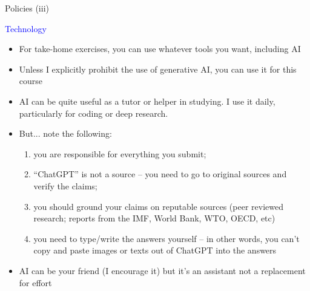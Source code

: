 \documentclass[notes,11pt, aspectratio=169, xcolor=table]{beamer}
\newenvironment{wideitemize}{\itemize\addtolength{\itemsep}{10pt}}{\enditemize}
\begin{document}
\begin{frame}{Policies (iii)}

\begin{wideitemize}
    \item  \textcolor{blue}{Technology}
    \begin{itemize}
        \item For take-home exercises, you can use whatever tools you want, including AI
        \item<2-> Unless I explicitly prohibit the use of generative AI, you can use it for this course
        \item<3-> AI can be quite useful as a tutor or helper in studying. I use it daily, particularly for coding or deep research.
        \item<4-> But... note the following:
        \begin{enumerate}
            \item you are responsible for everything you submit;
            \item ``ChatGPT'' is not a source -- you need to go to original sources and verify the claims;
            \item you should ground your claims on reputable sources (peer reviewed research; reports from the IMF, World Bank, WTO, OECD, etc)
            \item you need to type/write the answers yourself -- in other words, you can't copy and paste images or texts out of ChatGPT into the answers
        \end{enumerate}
        
        \item<5-> AI can be your friend (I encourage it) but it's an assistant not a replacement for effort
    \end{itemize}

\end{wideitemize}
    
\end{frame}
\end{document}
